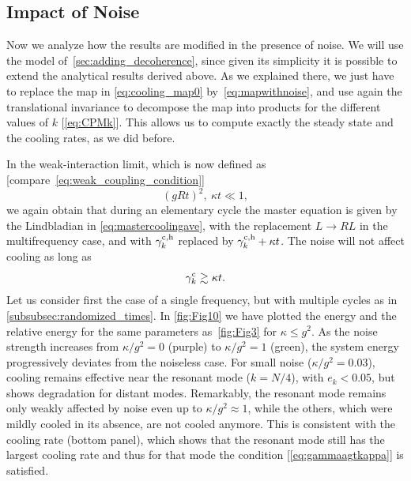 \documentclass[aps,prx,twocolumn,superscriptaddress,nofootinbib,nolongbibliography,nobalancelastpage,10pt,floatfix]{revtex4-2}
\begin{document}
\subsection{Impact of Noise}
\label{subsec:impact_noise}

Now we analyze how the results are modified in the presence of noise. We will use the model of~\cref{sec:adding_decoherence}, since given its simplicity it is possible to extend the analytical results derived above. As we explained there, we just have to replace the map in \cref{eq:cooling_map0} by~\cref{eq:mapwithnoise}, and use again the translational invariance to decompose the map into products for the different values of $k$ [\cref{eq:CPMk}]. This allows us to compute exactly the steady state and the cooling rates, as we did before.


In the weak-interaction limit, which is now defined as [compare~\cref{eq:weak_coupling_condition}]
\begin{equation}
    (g R t)^2,\ \kappa t \ll 1,
\end{equation}
we again obtain that during an elementary cycle the master equation is given by the Lindbladian in \cref{eq:mastercoolingave}, with the replacement $L\to RL$ in the multifrequency case, and with $\gamma^{\rm c,h}_k$ replaced by $\gamma^{\rm c,h}_k + \kappa t$. The noise will not affect cooling as long as
\begin{equation}
    \gamma^{\rm c}_k \gtrsim \kappa t.
    \label{eq:gammaagtkappa}
\end{equation}
Let us consider first the case of a single frequency, but with multiple cycles as in \cref{subsubsec:randomized_times}. In \cref{fig:Fig10} we have plotted the energy and the relative energy for the same parameters as~\cref{fig:Fig3} for $\kappa \le g^2$.
As the noise strength increases from $\kappa/g^2=0$ (purple) to $\kappa/g^2=1$ (green), the system energy progressively deviates from the noiseless case.
For small noise ($\kappa/g^2=0.03$), cooling remains effective near the resonant mode ($k=N/4$), with $e_k<0.05$, but shows degradation for distant modes. Remarkably, the resonant mode remains only weakly affected by noise even up to $\kappa/g^2\approx 1$, while the others, which were mildly cooled in its absence, are not cooled anymore. This is consistent with the cooling rate (bottom panel), which shows that the resonant mode still has the largest cooling rate and thus for that mode the condition [\cref{eq:gammaagtkappa}] is satisfied.
\end{document}
